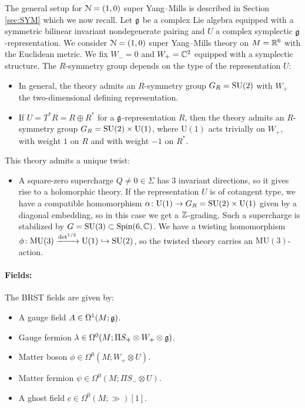 \documentclass[10pt, oneside]{article}
\newcommand{\MU}{\mathrm{MU}}
\renewcommand{\U}{\mathrm{U}}
\begin{document}
The general setup for $\mathcal N=(1, 0)$ super Yang--Mills is described in Section \ref{sec:SYM} which we now recall. Let $\mathfrak g$ be a complex Lie algebra equipped with a symmetric bilinear invariant nondegenerate pairing and $U$ a complex symplectic $\mathfrak g$-representation. We consider $\mathcal N=(1, 0)$ super Yang--Mills theory on $M=\mathbb R^6$ with the Euclidean metric. We fix $W_- = 0$ and $W_+=\mathbb C^2$ equipped with a symplectic structure. The $R$-symmetry group depends on the type of the representation $U$:
\begin{itemize}
\item In general, the theory admits an $R$-symmetry group $G_R=\mathrm{SU}(2)$ with $W_+$ the two-dimensional defining representation.

\item If $U = T^* R=R\oplus R^*$ for a $\mathfrak g$-representation $R$, then the theory admits an $R$-symmetry group $G_R=\SU(2)\times \U(1)$, where $\U(1)$ acts trivially on $W_+$, with weight $1$ on $R$ and with weight $-1$ on $R^*$.
\end{itemize}

This theory admits a unique twist:
\begin{itemize}
\item A square-zero supercharge $Q\neq 0\in\Sigma$ has 3 invariant directions, so it gives rise to a holomorphic theory. If the representation $U$ is of cotangent type, we have a compatible homomorphism $\alpha\colon \U(1)\rightarrow G_R=\SU(2)\times \U(1)$ given by a diagonal embedding, so in this case we get a $\mathbb Z$-grading. Such a supercharge is stabilized by $G=\mathrm{SU}(3)\subset \mathrm{Spin}(6, \mathbb C)$. We have a twisting homomorphism $\phi\colon\MU(3)\xrightarrow{\det^{1/2}}\U(1)\hookrightarrow \SU(2)$, so the twisted theory carries an $\MU(3)$-action.
\end{itemize}

\vspace{-10pt}
\paragraph{Fields:} The BRST fields are given by:
\begin{itemize}
\item A gauge field $A \in \Omega^1(M;\mathfrak g)$.
\item Gauge fermion $\lambda \in \Omega^0(M; \Pi S_+ \otimes W_+ \otimes \mathfrak g)$. 
\item Matter boson $\phi\in\Omega^0(M; W_+\otimes U)$.
\item Matter fermion $\psi\in\Omega^0(M; \Pi S_-\otimes U)$.
\item A ghost field $c\in \Omega^0(M; \gg)[1]$.
\end{itemize}
\end{document}
